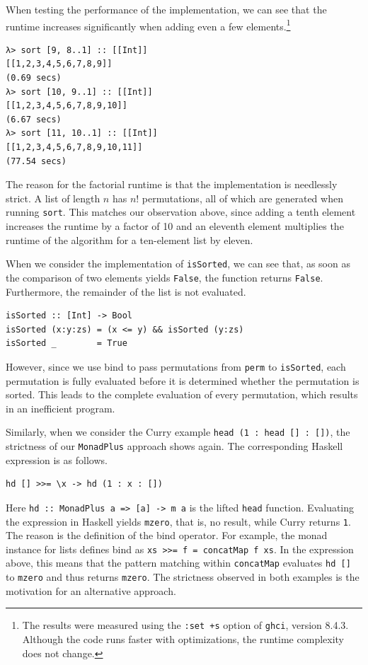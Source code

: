 \documentclass[a4paper, 11pt, fleqn, twoside, abstract=on]{scrreprt}
\newcommand{\hinl}[1]{\texttt{#1}}
\begin{document}
When testing the performance of the implementation, we can see that the runtime increases significantly when adding even a few elements.\footnote{The results were measured using the \texttt{:set +s} option of \texttt{ghci}, version 8.4.3. Although the code runs faster with optimizations, the runtime complexity does not change.}

\begin{verbatim}
λ> sort [9, 8..1] :: [[Int]]
[[1,2,3,4,5,6,7,8,9]]
(0.69 secs)
λ> sort [10, 9..1] :: [[Int]]
[[1,2,3,4,5,6,7,8,9,10]]
(6.67 secs)
λ> sort [11, 10..1] :: [[Int]]
[[1,2,3,4,5,6,7,8,9,10,11]]
(77.54 secs)
\end{verbatim}

The reason for the factorial runtime is that the implementation is needlessly strict.
A list of length $n$  has $n!$ permutations, all of which are generated when running \hinl{sort}.
This matches our observation above, since adding a tenth element increases the runtime by a factor of 10 and an eleventh element multiplies the runtime of the algorithm for a ten-element list by eleven.

When we consider the implementation of \hinl{isSorted}, we can see that, as soon as the comparison of two elements yields \hinl{False}, the function returns \hinl{False}.
Furthermore, the remainder of the list is not evaluated.

\begin{verbatim}
isSorted :: [Int] -> Bool
isSorted (x:y:zs) = (x <= y) && isSorted (y:zs)
isSorted _        = True
\end{verbatim}
\noindent
However, since we use bind to pass permutations from \hinl{perm} to \hinl{isSorted}, each permutation is fully evaluated before it is determined whether the permutation is sorted.
This leads to the complete evaluation of every permutation, which results in an inefficient program.

Similarly, when we consider the Curry example \hinl{head (1 : head [] : [])}, the strictness of our \hinl{MonadPlus} approach shows again.
The corresponding Haskell expression is as follows.

\begin{verbatim}
hd [] >>= \x -> hd (1 : x : [])
\end{verbatim}
\noindent
Here \hinl{hd :: MonadPlus a => [a] -> m a} is the lifted \hinl{head} function.
Evaluating the expression in Haskell yields \hinl{mzero}, that is, no result, while Curry returns \hinl{1}.
The reason is the definition of the bind operator.
For example, the monad instance for lists defines bind as \hinl{xs >>= f = concatMap f xs}.
In the expression above, this means that the pattern matching within \hinl{concatMap} evaluates \hinl{hd []} to \hinl{mzero} and thus returns \hinl{mzero}.
The strictness observed in both examples is the motivation for an alternative approach.
\end{document}
